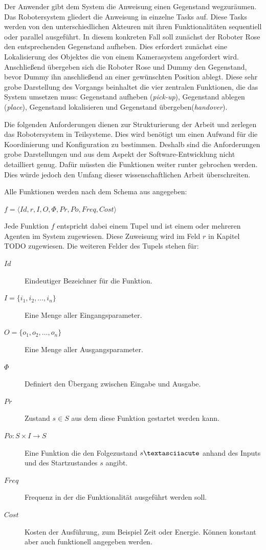 Der Anwender gibt dem System die Anweisung einen Gegenstand wegzuräumen. Das Robotersystem gliedert die Anweisung in einzelne Tasks auf. Diese Tasks werden von den unterschiedlichen Akteuren mit ihren Funktionalitäten sequentiell oder parallel ausgeführt. In diesem konkreten Fall soll zunächst der Roboter Rose den entsprechenden Gegenstand aufheben. Dies erfordert zunächst eine Lokalisierung des Objektes die von einem Kamerasystem angefordert wird. Anschließend übergeben sich die Roboter Rose und Dummy den Gegenstand, bevor Dummy ihn anschließend an einer gewünschten Position ablegt. Diese sehr grobe Darstellung des Vorgangs beinhaltet die vier zentralen Funktionen, die das System umsetzen muss: Gegenstand aufheben (\textit{pick-up}), Gegenstand ablegen (\textit{place}), Gegenstand lokalisieren und Gegenstand übergeben(\textit{handover}).

 Die folgenden Anforderungen dienen zur Strukturierung der Arbeit und zerlegen das Robotersystem in Teilsysteme. Dies wird benötigt um einen Aufwand für die Koordinierung und Konfiguration zu bestimmen. Deshalb sind die Anforderungen grobe Darstellungen und aus dem Aspekt der Software-Entwicklung nicht detailliert genug. Dafür müssten die Funktionen weiter runter gebrochen werden. Dies würde jedoch den Umfang dieser wissenschaftlichen Arbeit überschreiten.

Alle Funktionen werden nach dem Schema aus \cite{lundh2006plan} angegeben: 

$f = \langle  Id, r, I, O, \Phi, Pr, Po, Freq, Cost\rangle$

Jede Funktion $f$ entspricht dabei einem Tupel und ist einem oder mehreren Agenten im System zugewiesen. Diese Zuweisung wird im Feld $r$ in Kapitel TODO zugewiesen. Die weiteren Felder des Tupels stehen für:

\begin{description}
	\item [$Id$] Eindeutiger Bezeichner für die Funktion.
	\item [$I = \{i_1, i_2,\ldots,i_n\}$] Eine Menge aller Eingangsparameter.
	\item [$O = \{o_1, o_2,\ldots,o_n\}$] Eine Menge aller Ausgangsparameter.
	\item[$\Phi$] Definiert den Übergang zwischen Eingabe und Ausgabe.
	\item [$Pr$] Zustand $s \in S$ aus dem diese Funktion gestartet werden kann.
	\item [$Po : S \times I \rightarrow S$] Eine Funktion die den Folgezustand $s\textasciiacute$ anhand des Inputs und des Startzustandes $s$ angibt.
	\item[$Freq$] Frequenz in der die Funktionalität ausgeführt werden soll.
	\item[$Cost$] Kosten der Ausführung, zum Beispiel Zeit oder Energie. Können konstant aber auch funktionell angegeben werden.
\end{description}

